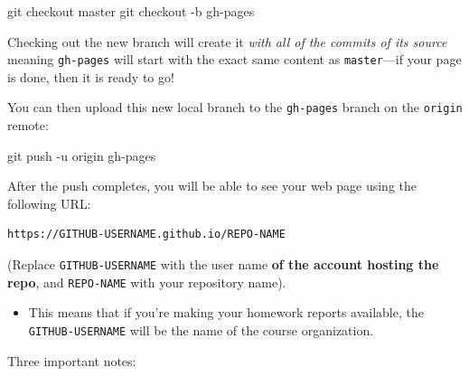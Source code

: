 \documentclass[]{book}
\newenvironment{Shaded}{\begin{snugshade}}{\end{snugshade}}
\newcommand{\FunctionTok}[1]{\textcolor[rgb]{0.00,0.00,0.00}{#1}}
\newcommand{\NormalTok}[1]{#1}
\providecommand{\tightlist}{%
  \setlength{\itemsep}{0pt}\setlength{\parskip}{0pt}}
\theoremstyle{definition}
\theoremstyle{definition}
\theoremstyle{remark}
\begin{document}
\begin{Shaded}
\begin{Highlighting}[]
\FunctionTok{git}\NormalTok{ checkout master}
\FunctionTok{git}\NormalTok{ checkout -b gh-pages}
\end{Highlighting}
\end{Shaded}

Checking out the new branch will create it \emph{with all of the commits
of its source} meaning \texttt{gh-pages} will start with the exact same
content as \texttt{master}---if your page is done, then it is ready to
go!

You can then upload this new local branch to the \texttt{gh-pages}
branch on the \texttt{origin} remote:

\begin{Shaded}
\begin{Highlighting}[]
\FunctionTok{git}\NormalTok{ push -u origin gh-pages}
\end{Highlighting}
\end{Shaded}

After the push completes, you will be able to see your web page using
the following URL:

\begin{verbatim}
https://GITHUB-USERNAME.github.io/REPO-NAME
\end{verbatim}

(Replace \texttt{GITHUB-USERNAME} with the user name \textbf{of the
account hosting the repo}, and \texttt{REPO-NAME} with your repository
name).

\begin{itemize}
\tightlist
\item
  This means that if you're making your homework reports available, the
  \texttt{GITHUB-USERNAME} will be the name of the course organization.
\end{itemize}

Three important notes:
\end{document}
